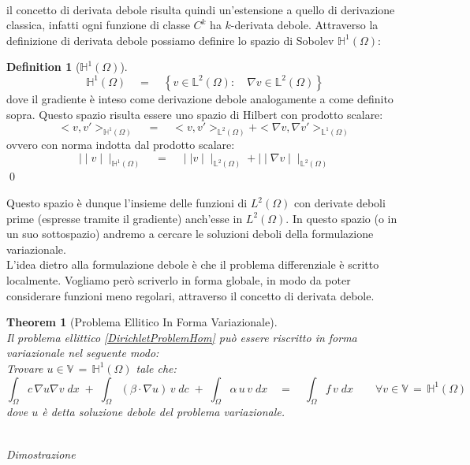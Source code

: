 \documentclass[12pt,a4paper]{report}
\theoremstyle{theorem}
\newtheorem{theorem}{Theorem}[section]
\theoremstyle{definition}
\newtheorem{definition}{Definition}[section]
\begin{document}
\hfill \\
il concetto di derivata debole risulta quindi un'estensione a quello di derivazione classica, infatti ogni funzione di classe $C^k$ ha $k$-derivata debole.
Attraverso la definizione di derivata debole possiamo definire lo spazio di Sobolev $\mathbb{H}^{1}(\Omega)$:
\begin{definition} [\textbf{$\mathbb{H}^{1}(\Omega)$}]
\hfill \\
\[ \mathbb{H}^{1}(\Omega) \quad = \quad \left \{ v \in \mathbb{L}^{2}(\Omega): \quad \nabla{v} \in \mathbb{L}^{2}(\Omega) \right \}	\]
dove il gradiente è inteso come derivazione debole analogamente a come definito sopra. Questo spazio risulta essere uno spazio di Hilbert con prodotto scalare:
\[ < v, v' >_{\mathbb{H}^{1}(\Omega)} \quad = \quad < v, v' >_{\mathbb{L}^{2}(\Omega)} + < \nabla{v}, \nabla{v}' >_{\mathbb{L}^{1}(\Omega)}\]
ovvero con norma indotta dal prodotto scalare:
\[ \mid \mid v \mid \mid _{\mathbb{H}^{1}(\Omega)}\quad = \quad \mid \mid v \mid \mid _{\mathbb{L}^{2}(\Omega)} + \mid \mid \nabla{v} \mid \mid _{\mathbb{L}^{2}(\Omega)} \]
\qed
\end{definition}
Questo spazio è dunque l'insieme delle funzioni di $L^{2}(\Omega)$ con derivate deboli prime (espresse tramite il gradiente) anch'esse in $L^{2}(\Omega)$. In questo spazio (o in un suo sottospazio) andremo a cercare le soluzioni deboli della formulazione variazionale. \\
L'idea dietro alla formulazione debole è che il problema differenziale è scritto localmente. Vogliamo però scriverlo in forma globale, in modo da poter considerare funzioni meno regolari, attraverso il concetto di derivata debole.
\begin{theorem} [Problema Ellitico In Forma Variazionale] \label{Problema Ellittico Debole}
\hfill \\
Il problema ellittico \ref{DirichletProblemHom} può essere riscritto in forma variazionale nel seguente modo:\\
Trovare $u \in  \mathbb{V} \, = \, \mathbb{H}^{1}(\Omega)$ tale che:
\[ \int_{\Omega}{c \, \nabla u \nabla v \; dx} \; + \; \int_{\Omega}{(\beta \cdot \nabla u) \, v \; dc} \; + \; \int_{\Omega}{\alpha \, u \, v \; dx} \quad = \quad \int_{\Omega}{f \, v \; dx} \qquad \forall v \in \mathbb{V} \, = \, \mathbb{H}^{1}(\Omega) \]
dove $u$ è detta soluzione debole del problema variazionale.
\end{theorem}
\hfill \\
\emph{Dimostrazione}\\
\end{document}
